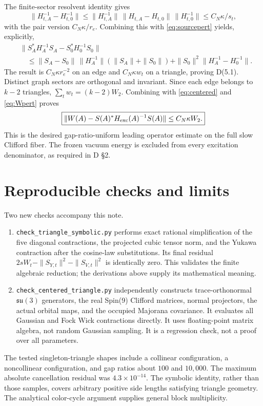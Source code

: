 \documentclass[11pt,letterpaper]{article}
\begin{document}
The finite-sector resolvent identity gives
\[
 \|H_{t,A}^{-1}-H_{t,0}^{-1}\|
 \le\|H_{t,A}^{-1}\|\,\|H_{t,A}-H_{t,0}\|\,
      \|H_{t,0}^{-1}\|
 \le C_N\kappa/s_t,
\]
with the pair version $C_N\kappa/r_e$. Combining this with \eqref{eq:sourcepert} yields, explicitly,
\begin{align*}
 &\|S_A^*H_A^{-1}S_A-S_0^*H_0^{-1}S_0\|\\
 &\quad\le\|S_A-S_0\|\,\|H_A^{-1}\|(\|S_A\|+\|S_0\|)
       +\|S_0\|^2\|H_A^{-1}-H_0^{-1}\|.
\end{align*}
The result is $C_N\kappa r_e^{-2}$ on an edge and $C_N\kappa w_t$ on a triangle, proving D(5.1). Distinct graph sectors are orthogonal and invariant. Since each edge belongs to $k-2$ triangles,
$\sum_tw_t=(k-2)W_2$. Combining with \eqref{eq:centered} and \eqref{eq:Wpert} proves
\begin{equation}
 \boxed{\|W(A)-S(A)^*H_{\rm exc}(A)^{-1}S(A)\|
            \le C_N\kappa W_2.} \label{eq:final}
\end{equation}
This is the desired gap-ratio-uniform leading operator estimate on the full slow Clifford fiber. The frozen vacuum energy is excluded from every excitation denominator, as required in D \S2.

\section{Reproducible checks and limits}
Two new checks accompany this note.
\begin{enumerate}
\item \texttt{check\_triangle\_symbolic.py} performs exact rational simplification of the five diagonal contractions, the projected cubic tensor norm, and the Yukawa contraction after the cosine-law substitutions. Its final residual $2sW_t-\|S_{Y,t}\|^2-\|S_{V,t}\|^2$ is identically zero. This validates the finite algebraic reduction; the derivations above supply its mathematical meaning.
\item \texttt{check\_centered\_triangle.py} independently constructs trace-orthonormal $\mathfrak{su}(3)$ generators, the real Spin(9) Clifford matrices, normal projectors, the actual orbital maps, and the occupied Majorana covariance. It evaluates all Gaussian and Fock Wick contractions directly. It uses floating-point matrix algebra, not random Gaussian sampling. It is a regression check, not a proof over all parameters.
\end{enumerate}
The tested singleton-triangle shapes include a collinear configuration, a noncollinear configuration, and gap ratios about $100$ and $10{,}000$. The maximum absolute cancellation residual was $4.3\times10^{-14}$. The symbolic identity, rather than those samples, covers arbitrary positive side lengths satisfying triangle geometry. The analytical color-cycle argument supplies general block multiplicity.
\end{document}

